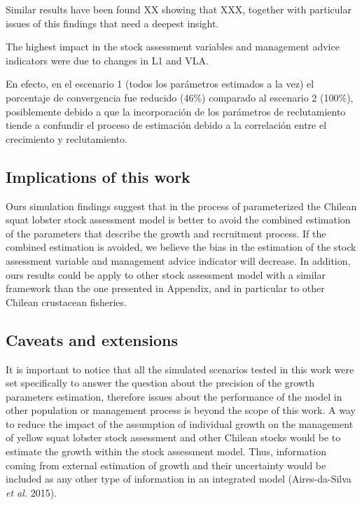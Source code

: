 \documentclass[11pt,letterpaper,]{article}
\begin{document}
Similar results have been found XX showing that XXX, together with
particular issues of this findings that need a deepest insight.

The highest impact in the stock assessment variables and management
advice indicators were due to changes in L1 and VLA.

En efecto, en el escenario 1 (todos los parámetros estimados a la vez)
el porcentaje de convergencia fue reducido (46\%) comparado al escenario
2 (100\%), posiblemente debido a que la incorporación de los parámetros
de reclutamiento tiende a confundir el proceso de estimación debido a la
correlación entre el crecimiento y reclutamiento.

\subsection{Implications of this work}\label{implications-of-this-work}

Ours simulation findings suggest that in the process of parameterized
the Chilean squat lobster stock assessment model is better to avoid the
combined estimation of the parameters that describe the growth and
recruitment process. If the combined estimation is avoided, we believe
the bias in the estimation of the stock assessment variable and
management advice indicator will decrease. In addition, ours results
could be apply to other stock assessment model with a similar framework
than the one presented in Appendix, and in particular to other Chilean
crustacean fisheries.

\subsection{Caveats and extensions}\label{caveats-and-extensions}

It is important to notice that all the simulated scenarios tested in
this work were set specifically to answer the question about the
precision of the growth parameters estimation, therefore issues about
the performance of the model in other population or management process
is beyond the scope of this work. A way to reduce the impact of the
assumption of individual growth on the management of yellow squat
lobster stock assessment and other Chilean stocks would be to estimate
the growth within the stock assessment model. Thus, information coming
from external estimation of growth and their uncertainty would be
included as any other type of information in an integrated model
(Aires-da-Silva \emph{et al.} 2015).
\end{document}
